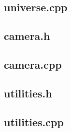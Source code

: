 \documentclass[10pt,a4paper]{article}
\begin{document}
\subsection{universe.cpp}

\clearpage
\subsection{camera.h}

\subsection{camera.cpp}

\clearpage
\subsection{utilities.h}

\subsection{utilities.cpp}

\end{document}
